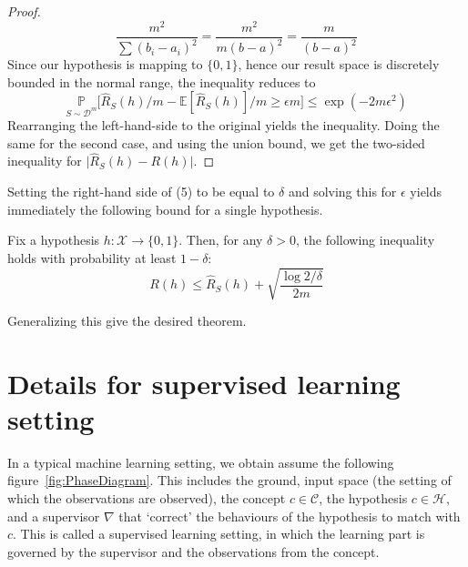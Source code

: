 \documentclass{article}
\begin{document}
\begin{proof}
\begin{equation*}
        \frac{m^{2}}{\sum (b_{i} - a_{i})^{2}} = \frac{m^{2}}{m(b-a)^{2}} = \frac{m}{(b-a)^{2}}
    \end{equation*}
    Since our hypothesis is mapping to $\{0,1\}$, hence our result space is discretely bounded in the normal range, the inequality reduces to 
    \begin{equation}
        \underset{S\sim \mathcal{D}^{m}}{\mathbb{P}} \Big[ \hat{R}_{S}(h)/m - \mathbb{E}[\hat{R}_{S}(h)]/m \geq \epsilon m \Big] \leq \exp{\left(-2m\epsilon^{2}\right)}
    \end{equation}
    Rearranging the left-hand-side to the original yields the inequality. Doing the same for the second case, and using the union bound, we get the two-sided inequality for $\lvert \hat{R}_{S}(h) - R(h)\rvert$. 
\end{proof}

Setting the right-hand side of (5) to be equal to $\delta$ and solving this for $\epsilon$ yields immediately the following bound for a single hypothesis. 

\begin{col}
    Fix a hypothesis $h: \mathcal{X}\to \{0,1\}$. Then, for any $\delta > 0$, the following inequality holds with probability at least $1-\delta$: 
    \begin{equation}
        R(h) \leq \hat{R}_S(h) + \sqrt{\frac{\log{2/\delta}}{2m}}
    \end{equation}
\end{col}

Generalizing this give the desired theorem.

\section{Details for supervised learning setting}

In a typical machine learning setting, we obtain assume the following figure~\ref{fig:PhaseDiagram}. This includes the ground, input space (the setting of which the observations are observed), the concept $c\in\mathcal{C}$, the hypothesis $c\in \mathcal{H}$, and a supervisor $\nabla$ that `correct' the behaviours of the hypothesis to match with $c$. This is called a supervised learning setting, in which the learning part is governed by the supervisor and the observations from the concept.
\end{document}
